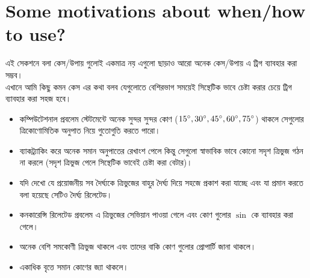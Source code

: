 \documentclass[12pt]{article}
\begin{document}
\section{Some motivations about when/how to use?} %
এই সেকশনে বলা কেস/উপায় গুলোই একমাত্র নয় এগুলো ছাড়াও আরো অনেক কেস/উপায় এ ট্রিগ ব্যাবহার করা সম্ভব। \\
এখানে আমি কিছু কমন কেস এর কথা বলব যেগুলোতে বেশিরভাগ সময়েই সিন্থেটিক ভাবে চেষ্টা করার চেয়ে ট্রিগ ব্যাবহার করা সহজ হবে।\\
\begin{itemize}
    \item কম্পিউটেশনাল প্রবলেম স্টেটমেন্টে অনেক সুন্দর সুন্দর কোণ ($15^\circ,30^\circ, 
        45^\circ,60^\circ, 75^\circ$) থাকলে সেগুলোর ত্রিকোণোমিতিক অনুপাত নিয়ে গুতোগুতি করতে পারো।
    \item ব্যাকট্র্যাকিং করে অনেক সমান অনুপাতের রেখাংশ পেলে কিন্তু সেগুলো স্বাভাবিক ভাবে কোনো 
        সদৃশ ত্রিভুজ গঠন না করলে (সদৃশ ত্রিভুজ পেলে সিন্থেটিক ভাবেই চেষ্টা করা বেটার)।
    \item যদি দেখো যে প্রয়োজনীয় সব দৈর্ঘ্যকে ত্রিভুজের বাহুর দৈর্ঘ্য দিয়ে সহজে প্রকাশ করা যাচ্ছে এবং 
        যা প্রমান করতে বলা হয়েছে সেটিও দৈর্ঘ্য রিলেটেড।
    \item কনকারেন্সি রিলেটেড প্রবলেম এ ত্রিভুজের সেভিয়ান পাওয়া গেলে এবং কোণ গুলোর $\sin$ কে ব্যাবহার করা গেলে।
    \item অনেক বেশি সমকোণী ত্রিভুজ থাকলে এবং তাদের বাকি কোণ গুলোর প্রোপার্টি জানা থাকলে।
    \item একাধিক বৃত্তে সমান কোণের জ্যা থাকলে।
\end{itemize}
\end{document}
